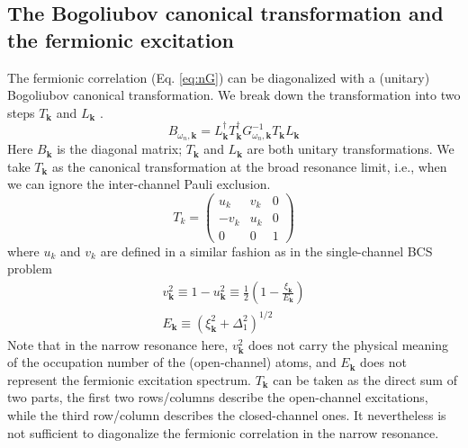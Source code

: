 \documentclass[reprint,pra]{revtex4-1}
\newcommand{\vk}{\ensuremath{\mathbf{k}}}
\newcommand{\nth}[1]{\ensuremath{\frac{1}{#1}}}
\newcommand{\br}[1]{\ensuremath{\left(#1\right)}}
\newcommand{\mtrx}[1]{\ensuremath{\begin{pmatrix}#1\end{pmatrix}}}
\newcommand{\dg}{\ensuremath{\dagger}}
\begin{document}
 \subsection{The Bogoliubov canonical transformation and the  fermionic excitation\label{sec:fermionic}}
 The fermionic correlation (Eq. \ref{eq:nG}) can be diagonalized with a (unitary) Bogoliubov canonical transformation.  We  break down the transformation into two steps $T_{\vk}$ and $L_{\vk}$ . 
\begin{equation}\label{eq:pathInt2:B}
B_{\omega_{n},\vk}=L_{\vk}^{\dg}T_{\vk}^{\dg}G_{\omega_{n},\vk}^{-1}T_{\vk}L_{\vk}
\end{equation} 
Here $B_{\vk}$ is the diagonal matrix; $T_{\vk}$ and $L_{\vk}$ are both unitary transformations.  We take $T_{\vk}$ as the canonical transformation at the broad resonance limit, i.e., when we can ignore the inter-channel Pauli exclusion. 
\begin{equation}\label{eq:pathInt2:T}
T_k=\mtrx{u_k&v_k&0\\-v_k&u_k&0\\0&0&1}
\end{equation}	
where $u_{k}$ and $v_{k}$ are defined in a similar fashion as in the single-channel BCS  problem
\begin{gather}
v_{\vk}^{2}\equiv1-u_{\vk}^{2}\equiv\nth{2}\br{1-\frac{\xi_{\vk}}{E_{\vk}}}\\
E_{\vk}\equiv(\xi_{\vk}^{2}+\Delta_{1}^{2})^{1/2}
\end{gather}
 Note that in the narrow resonance here,  $v_{\vk}^{2}$  does not carry the physical meaning of the occupation number of the (open-channel) atoms, and $E_{\vk}$   does not represent the fermionic excitation spectrum. $T_{\vk}$ can be taken as the direct sum of two parts, the first two rows/columns describe the open-channel excitations, while the third row/column describes the closed-channel ones.  It nevertheless is not sufficient to diagonalize the fermionic correlation in the narrow resonance.  
\end{document}
